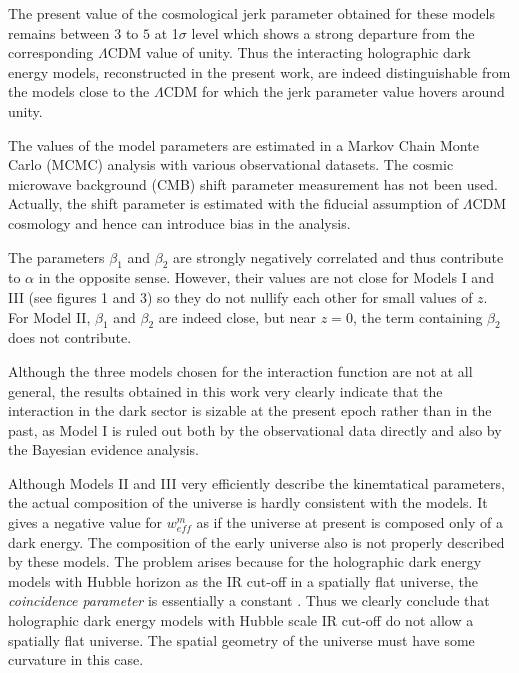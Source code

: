 \documentclass[11pt]{article}
\begin{document}
\par The present value of the cosmological jerk parameter obtained for these models remains between $3$ to $5$ at 1$\sigma$ level which shows a strong departure from the corresponding $\Lambda$CDM value of unity. Thus the interacting holographic dark energy models, reconstructed in the present work, are indeed distinguishable from the models close to the $\Lambda$CDM for which the jerk parameter value hovers around unity. 


\par The values of the model parameters are estimated in a Markov Chain Monte Carlo (MCMC) analysis with various observational datasets. The cosmic microwave background (CMB) shift parameter measurement has not been used. Actually, the shift parameter is estimated with the fiducial assumption of $\Lambda$CDM cosmology and hence can introduce bias in the analysis.

\par The parameters $\beta_1$ and $\beta_2$ are strongly negatively correlated and thus contribute to $\alpha$ in the opposite sense. However, their values are not close for Models I and III (see figures 1 and 3) so they do not nullify each other for small values of $z$. For Model II, $\beta_1$ and $\beta_2$ are indeed close, but near $z=0$, the term containing $\beta_2$ does not contribute.

\par Although the three models chosen for the interaction function are not at all general, the results obtained in this work very clearly indicate that the interaction in the dark sector is sizable at the present epoch rather than in the past, as Model I is ruled out both by the observational data directly and also by the Bayesian evidence analysis. 

\par Although Models II and III very efficiently describe the kinemtatical parameters, the actual composition of the universe is hardly consistent with the models. It gives a negative value for  $w_{eff}^m$ as if the universe at present is composed only of a dark energy. The composition of the early universe also is not properly described by these models. The problem arises because for the holographic dark energy models with Hubble horizon as the IR cut-off in a spatially flat universe, the { \it coincidence parameter} is essentially a constant \cite{senpav}. Thus we clearly conclude that holographic dark energy models with Hubble scale IR cut-off do not allow a spatially flat universe. The spatial geometry of the universe must have some curvature in this case.
\end{document}
